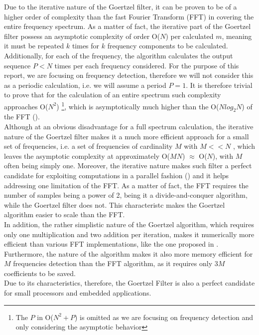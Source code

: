 Due to the iterative nature of the Goertzel filter, it can be proven to be of a higher order of complexity than the fast Fourier Transform (FFT) in covering the entire frequency spectrum. As a matter of fact, the iterative part of the Goertzel filter possess an asymptotic complexity of order O($N$) per calculated $m$, meaning it must be repeated $k$ times for $k$ frequency components to be calculated. Additionally, for each of the frequency, the algorithm calculates the output sequence $P<N$ times per each frequency considered. For the purpose of this report, we are focusing on frequency detection, therefore we will not consider this as a periodic calculation, i.e. we will assume a period $P=1$. It is therefore trivial to prove that for the calculation of an entire spectrum such complexity approaches O($N^2$) \footnote{The $P$ in O($N^2+ P$) is omitted as we are focusing on frequency detection and only considering the asymptotic behavior}, which is asymptotically much higher than the O($N log_2N$) of the FFT (\cite{FFT}). \\
Although at an obvious disadvantage for a full spectrum calculation, the iterative nature of the Goertzel filter makes it a much more efficient approach for a small set of frequencies, i.e. a set of frequencies of cardinality $M$ with $ M<< N$ , which leaves the asymptotic complexity at approximately O($MN$) $\approx$ O($N$), with $M$ often being simply one. Moreover, the iterative nature makes such filter a perfect candidate for exploiting computations in a parallel fashion (\cite{Chen1998ModifiedGA}) and it helps addressing one limitation of the FFT. As a matter of fact, the FFT requires the number of samples being a power of 2, being it a divide-and-conquer algorithm, while the Goertzel filter does not. This characteristc makes the Goertzel algorithm easier to scale than the FFT.  \\
In addition, the rather simplistic nature of the Goertzel algorithm, which requires only one multiplication and two addition per iteration, makes it numerically more efficient than various FFT implementations, like the one proposed in \cite{Press2007}.
Furthermore, the nature of the algorithm makes it also more memory efficient for $M$ frequencies detection than the FFT algorithm, as it requires only 3$M$ coefficients to be saved. \\
Due to its characteristics, therefore, the Goertzel Filter is also a perfect candidate for small processors and embedded applications. 